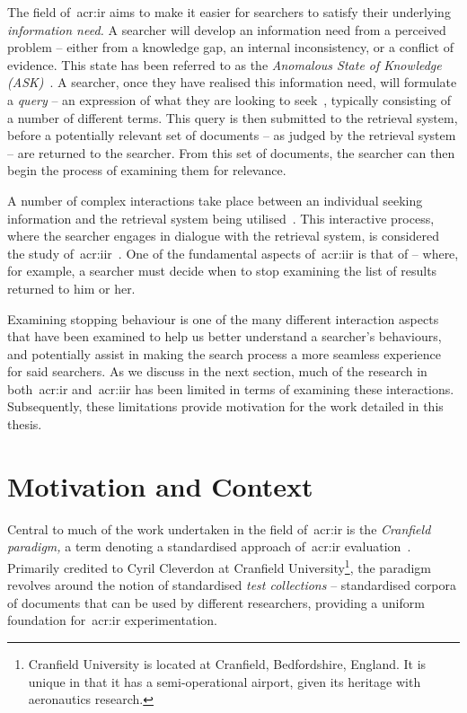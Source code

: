 The field of~\gls{acr:ir} aims to make it easier for searchers to satisfy their underlying \emph{information need.} A searcher will develop an information need from a perceived problem -- either from a knowledge gap, an internal inconsistency, or a conflict of evidence. This state has been referred to as the \emph{Anomalous State of Knowledge (ASK)}~\citep{belkin1980ask}. A searcher, once they have realised this information need, will formulate a \emph{query} -- an expression of what they are looking to seek~\citep{borlund2003iir_model}, typically consisting of a number of different terms. This query is then submitted to the retrieval system, before a potentially relevant set of documents -- as judged by the retrieval system -- are returned to the searcher. From this set of documents, the searcher can then begin the process of examining them for relevance.

A number of complex interactions take place between an individual seeking information and the retrieval system being utilised~\citep{ingwersen2005theturn}. This interactive process, where the searcher engages in dialogue with the retrieval system, is considered the study of~\gls{acr:iir}~\citep{borlund2003iir_model}. One of the fundamental aspects of~\gls{acr:iir} is that of  -- where, for example, a searcher must decide when to stop examining the list of results returned to him or her.

Examining stopping behaviour is one of the many different interaction aspects that have been examined to help us better understand a searcher's behaviours, and potentially assist in making the search process a more seamless experience for said searchers. As we discuss in the next section, much of the research in both~\gls{acr:ir} and~\gls{acr:iir} has been limited in terms of examining these interactions. Subsequently, these limitations provide motivation for the work detailed in this thesis.

\section{Motivation and Context}
Central to much of the work undertaken in the field of~\gls{acr:ir} is the \emph{Cranfield paradigm,} a term denoting a standardised approach of~\gls{acr:ir} evaluation~\citep{aslib1966factors}. Primarily credited to Cyril Cleverdon at Cranfield University\footnote{Cranfield University is located at Cranfield, Bedfordshire, England. It is unique in that it has a semi-operational airport, given its heritage with aeronautics research.}, the paradigm revolves around the notion of standardised \emph{test collections} -- standardised corpora of documents that can be used by different researchers, providing a uniform foundation for~\gls{acr:ir} experimentation.

